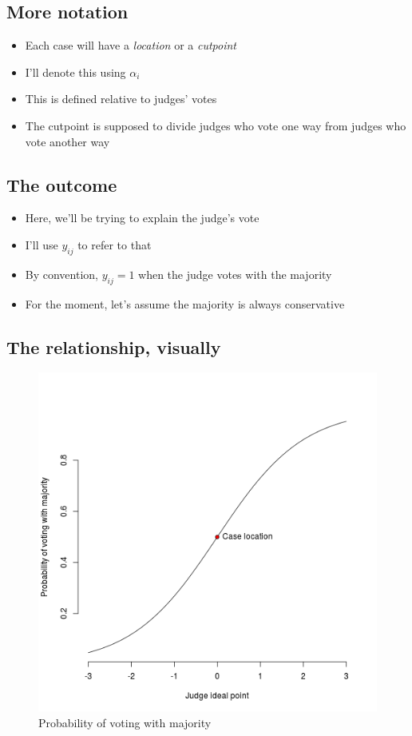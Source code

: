 \documentclass[12pt,twoside]{article}
\providecommand{\tightlist}{%
  \setlength{\itemsep}{0pt}\setlength{\parskip}{0pt}}
\begin{document}
\subsection{More notation}\label{more-notation}

\begin{itemize}
\tightlist
\item
  Each case will have a \emph{location} or a \emph{cutpoint}
\item
  I'll denote this using \(\alpha_i\)
\item
  This is defined relative to judges' votes
\item
  The cutpoint is supposed to divide judges who vote one way from judges
  who vote another way
\end{itemize}

\subsection{The outcome}\label{the-outcome}

\begin{itemize}
\tightlist
\item
  Here, we'll be trying to explain the judge's vote
\item
  I'll use \(y_{ij}\) to refer to that
\item
  By convention, \(y_{ij}=1\) when the judge votes with the majority
\item
  For the moment, let's assume the majority is always conservative
\end{itemize}

\subsection{The relationship, visually}\label{the-relationship-visually}

\begin{figure}[htbp]
\centering
\includegraphics{figure/irtfig1-1.png}
\caption{Probability of voting with majority}
\end{figure}
\end{document}

